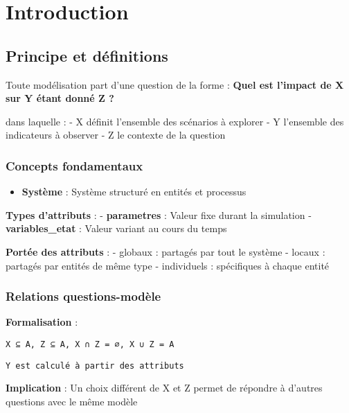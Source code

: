 \documentclass[
]{article}
\author{}
\date{\vspace{-2.5em}}
\providecommand{\tightlist}{%
  \setlength{\itemsep}{0pt}\setlength{\parskip}{0pt}}
\begin{document}
\section{Introduction}\label{introduction}

\subsection{Principe et définitions}\label{principe-et-duxe9finitions}

Toute modélisation part d'une question de la forme : \textbf{Quel est
l'impact de X sur Y étant donné Z ?}

dans laquelle : - X définit l'ensemble des scénarios à explorer - Y
l'ensemble des indicateurs à observer - Z le contexte de la question

\subsubsection{Concepts fondamentaux}\label{concepts-fondamentaux}

\begin{itemize}
\tightlist
\item
  \textbf{Système} : Système structuré en entités et processus
\end{itemize}

\textbf{Types d'attributs} : - \textbf{parametres} : Valeur fixe durant
la simulation - \textbf{variables\_etat} : Valeur variant au cours du
temps

\textbf{Portée des attributs} : - globaux : partagés par tout le système
- locaux : partagés par entités de même type - individuels : spécifiques
à chaque entité

\subsubsection{Relations
questions-modèle}\label{relations-questions-moduxe8le}

\textbf{Formalisation} :

\begin{verbatim}
X ⊆ A, Z ⊆ A, X ∩ Z = ∅, X ∪ Z = A
\end{verbatim}

\begin{verbatim}
Y est calculé à partir des attributs
\end{verbatim}

\textbf{Implication} : Un choix différent de X et Z permet de répondre à
d'autres questions avec le même modèle
\end{document}
